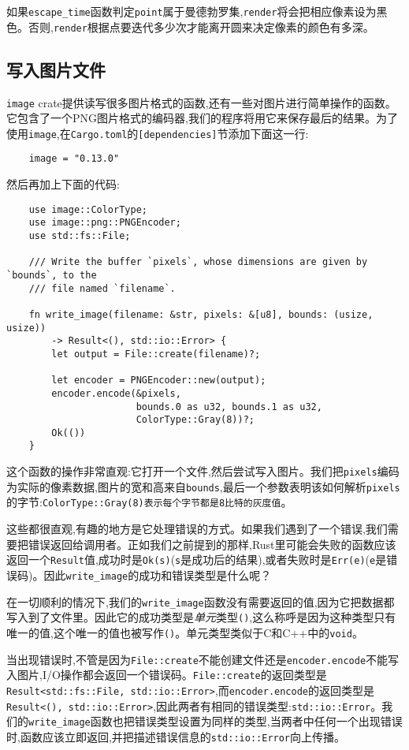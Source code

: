 如果\texttt{escape\_time}函数判定\texttt{point}属于曼德勃罗集,\texttt{render}将会把相应像素设为黑色。否则,\texttt{render}根据点要迭代多少次才能离开圆来决定像素的颜色有多深。

\subsection{写入图片文件}
\texttt{image} crate提供读写很多图片格式的函数,还有一些对图片进行简单操作的函数。它包含了一个PNG图片格式的编码器,我们的程序将用它来保存最后的结果。为了使用\texttt{image},在\texttt{Cargo.toml}的\texttt{[dependencies]}节添加下面这一行:
\begin{verbatim}
    image = "0.13.0"
\end{verbatim}

然后再加上下面的代码:
\begin{verbatim}
    use image::ColorType;
    use image::png::PNGEncoder;
    use std::fs::File;

    /// Write the buffer `pixels`, whose dimensions are given by `bounds`, to the
    /// file named `filename`.

    fn write_image(filename: &str, pixels: &[u8], bounds: (usize, usize))
        -> Result<(), std::io::Error> {
        let output = File::create(filename)?;

        let encoder = PNGEncoder::new(output);
        encoder.encode(&pixels,
                       bounds.0 as u32, bounds.1 as u32,
                       ColorType::Gray(8))?;
        Ok(())
    }
\end{verbatim}

这个函数的操作非常直观:它打开一个文件,然后尝试写入图片。我们把\texttt{pixels}编码为实际的像素数据,图片的宽和高来自\texttt{bounds},最后一个参数表明该如何解析\texttt{pixels}的字节:\texttt{ColorType::Gray(8)表示每个字节都是8比特的灰度值}。

这些都很直观,有趣的地方是它处理错误的方式。如果我们遇到了一个错误,我们需要把错误返回给调用者。正如我们之前提到的那样,Rust里可能会失败的函数应该返回一个\texttt{Result}值,成功时是\texttt{Ok(s)}(\texttt{s}是成功后的结果),或者失败时是\texttt{Err(e)}(\texttt{e}是错误码)。因此\texttt{write\_image}的成功和错误类型是什么呢？

在一切顺利的情况下,我们的\texttt{write\_image}函数没有需要返回的值,因为它把数据都写入到了文件里。因此它的成功类型是\emph{单元}类型\texttt{()},这么称呼是因为这种类型只有唯一的值,这个唯一的值也被写作\texttt{()}。单元类型类似于C和C++中的\texttt{void}。

当出现错误时,不管是因为\texttt{File::create}不能创建文件还是\texttt{encoder.encode}不能写入图片,I/O操作都会返回一个错误码。\texttt{File::create}的返回类型是\texttt{Result<std::fs::File, std::io::Error>},而\texttt{encoder.encode}的返回类型是\texttt{Result<(), std::io::Error>},因此两者有相同的错误类型:\texttt{std::io::Error}。我们的\texttt{write\_image}函数也把错误类型设置为同样的类型,当两者中任何一个出现错误时,函数应该立即返回,并把描述错误信息的\texttt{std::io::Error}向上传播。

